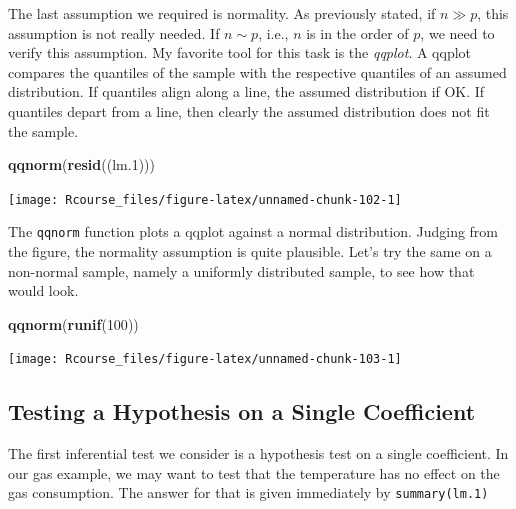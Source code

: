 \documentclass[]{book}
\newenvironment{Shaded}{\begin{snugshade}}{\end{snugshade}}
\newcommand{\KeywordTok}[1]{\textcolor[rgb]{0.13,0.29,0.53}{\textbf{{#1}}}}
\newcommand{\DecValTok}[1]{\textcolor[rgb]{0.00,0.00,0.81}{{#1}}}
\newcommand{\FloatTok}[1]{\textcolor[rgb]{0.00,0.00,0.81}{{#1}}}
\newcommand{\StringTok}[1]{\textcolor[rgb]{0.31,0.60,0.02}{{#1}}}
\newcommand{\NormalTok}[1]{{#1}}
\theoremstyle{definition}
\theoremstyle{definition}
\theoremstyle{remark}
\begin{document}
The last assumption we required is normality. As previously stated, if
\(n \gg p\), this assumption is not really needed. If \(n \sim p\),
i.e., \(n\) is in the order of \(p\), we need to verify this assumption.
My favorite tool for this task is the \emph{qqplot}. A qqplot compares
the quantiles of the sample with the respective quantiles of an assumed
distribution. If quantiles align along a line, the assumed distribution
if OK. If quantiles depart from a line, then clearly the assumed
distribution does not fit the sample.

\begin{Shaded}
\begin{Highlighting}[]
\KeywordTok{qqnorm}\NormalTok{(}\KeywordTok{resid}\NormalTok{((lm}\FloatTok{.1}\NormalTok{)))}
\end{Highlighting}
\end{Shaded}

\texttt{[image: Rcourse\_files/figure-latex/unnamed-chunk-102-1]}

The \texttt{qqnorm} function plots a qqplot against a normal
distribution. Judging from the figure, the normality assumption is quite
plausible. Let's try the same on a non-normal sample, namely a uniformly
distributed sample, to see how that would look.

\begin{Shaded}
\begin{Highlighting}[]
\KeywordTok{qqnorm}\NormalTok{(}\KeywordTok{runif}\NormalTok{(}\DecValTok{100}\NormalTok{))}
\end{Highlighting}
\end{Shaded}

\texttt{[image: Rcourse\_files/figure-latex/unnamed-chunk-103-1]}

\subsection{Testing a Hypothesis on a Single
Coefficient}\label{testing-a-hypothesis-on-a-single-coefficient}

The first inferential test we consider is a hypothesis test on a single
coefficient. In our gas example, we may want to test that the
temperature has no effect on the gas consumption. The answer for that is
given immediately by \texttt{summary(lm.1)}

\begin{Shaded}
\end{Shaded}
\end{document}
